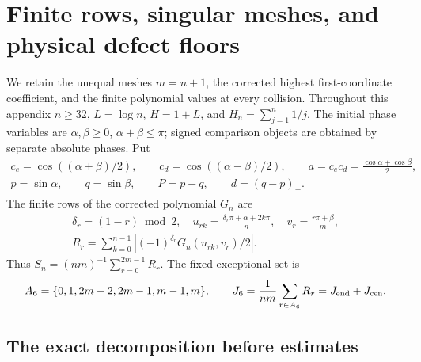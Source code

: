 \section{Finite rows, singular meshes, and physical defect floors}
\label{app:row-estimates}

We retain the unequal meshes $m=n+1$, the corrected highest
first-coordinate coefficient, and the finite polynomial values at every
collision. Throughout this appendix $n\geq32$, $L=\log n$, $H=1+L$,
and $H_n=\sum_{j=1}^n1/j$. The initial phase variables are
$\alpha,\beta\geq0$, $\alpha+\beta\leq\pi$; signed comparison objects
are obtained by separate absolute phases. Put
\begin{gather*}
 c_e=\cos((\alpha+\beta)/2),\qquad
 c_d=\cos((\alpha-\beta)/2),\qquad
 a=c_ec_d=\frac{\cos\alpha+\cos\beta}{2},\\
 p=\sin\alpha,\qquad q=\sin\beta,\qquad P=p+q,\qquad d=(q-p)_+.
\end{gather*}
The finite rows of the corrected polynomial $G_n$ are
\begin{gather*}
 \delta_r=(1-r)\bmod2,\quad
 u_{rk}=\frac{\delta_r\pi+\alpha+2k\pi}{n},\quad
 v_r=\frac{r\pi+\beta}{m},\\
 R_r=\sum_{k=0}^{n-1}|(-1)^{\delta_r}G_n(u_{rk},v_r)/2|.
\end{gather*}
Thus $S_n=(nm)^{-1}\sum_{r=0}^{2m-1}R_r$. The fixed exceptional set is
\begin{equation}\label{eq:six-rows}
 A_6=\{0,1,2m-2,2m-1,m-1,m\},\qquad
 J_6=\frac1{nm}\sum_{r\in A_6}R_r=J_{\rm end}+J_{\rm cen}.
\end{equation}

\subsection{The exact decomposition before estimates}

